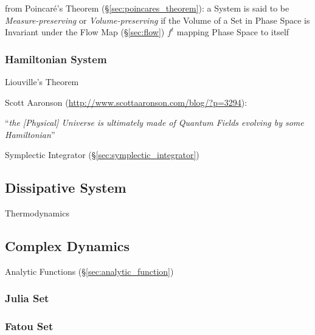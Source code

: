 from Poincar\'e's Theorem (\S\ref{sec:poincares_theorem}): a System is said to
be \emph{Measure-preserving} or \emph{Volume-preserving} if the Volume of a Set
in Phase Space is Invariant under the Flow Map (\S\ref{sec:flow}) $f^t$ mapping
Phase Space to itself



\subsubsection{Hamiltonian System}\label{sec:hamiltonian_system}

Liouville's Theorem


Scott Aaronson (\url{http://www.scottaaronson.com/blog/?p=3294}):

``\emph{the [Physical] Universe is ultimately made of Quantum Fields
  evolving by some Hamiltonian}''

Symplectic Integrator (\S\ref{sec:symplectic_integrator})



\subsection{Dissipative System}\label{sec:dissipative_system}

Thermodynamics



\subsection{Complex Dynamics}\label{sec:complex_dynamics}

Analytic Functions (\S\ref{sec:analytic_function})



\subsubsection{Julia Set}\label{sec:julia_set}

\subsubsection{Fatou Set}\label{sec:fatou_set}



